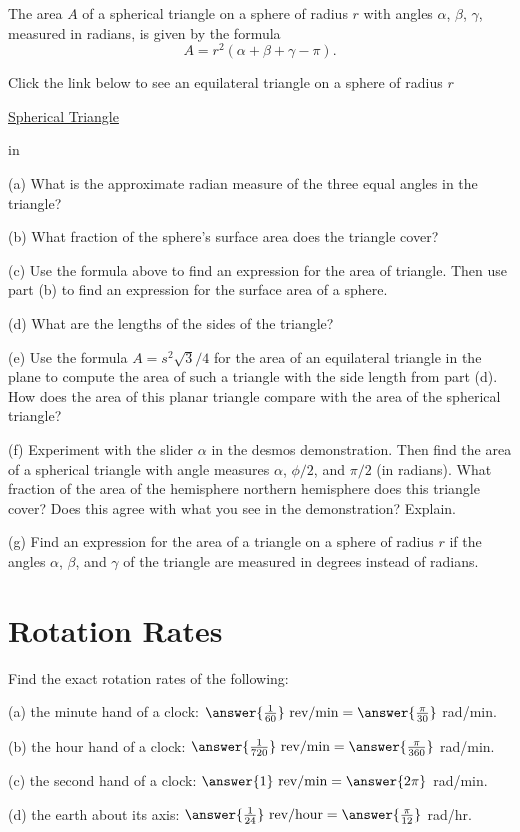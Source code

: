 \documentclass{ximera}
\newcommand{\pskip}{\vskip 0.1 in}
\begin{document}
\begin{question} \label{Q999:Radians}
The area $A$ of a spherical triangle on a sphere of radius $r$ with angles $\alpha$, $\beta$, $\gamma$, measured in radians, is given by the formula
\[
 A = r^2 (\alpha+\beta+\gamma - \pi) .
\]

Click the link below to see an equilateral triangle on a sphere of radius $r$

\href{https://www.desmos.com/3d/91881c3088}{Spherical Triangle}

\pskip

(a) What is the approximate radian measure of the three equal angles in the triangle?

(b) What fraction of the sphere's surface area does the triangle cover?

(c) Use the formula above to find an expression for the area of triangle. Then use part (b) to find an expression for the surface area of a sphere.

(d) What are the lengths of the sides of the triangle?

(e) Use the formula $A=s^2\sqrt{3}/4$ for the area of an equilateral triangle in the plane to compute the area of such a triangle with the side length from part (d). How does the area of this planar triangle compare with the area of the spherical triangle?

(f) Experiment with the slider $\alpha$ in the desmos demonstration. Then find the area of a spherical triangle with angle measures $\alpha$, $\phi/2$, and $\pi/2$ (in radians). What fraction of the area of the hemisphere northern hemisphere does this triangle cover? Does this agree with what you see in the demonstration? Explain.

(g) Find an expression for the area of a triangle on a sphere of radius $r$ if the angles $\alpha$, $\beta$, and $\gamma$ of the triangle are measured in degrees instead of radians.  

\end{question}


\section{Rotation Rates}
\begin{question}  \label{Q245: Angles}
Find the exact rotation rates of the following:

(a) the minute hand of a clock: $\answer{\frac{1}{60}} \text{ rev/min} = \answer{\frac{\pi}{30}}$ rad/min. 

(b) the hour hand of a clock: $\answer{\frac{1}{720}} \text{ rev/min} =\answer{\frac{\pi}{360}}$ rad/min. 

(c) the second hand of a clock: $\answer{1} \text{ rev/min} =\answer{2\pi}$ rad/min. 

(d) the earth about its axis: $\answer{\frac{1}{24}} \text{ rev/hour} =\answer{\frac{\pi}{12}}$ rad/hr.

\end{question}
\end{document}
